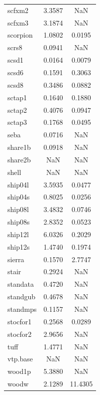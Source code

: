 \begin{longtable}{lcc}
scfxm2   &   3.3587 &      NaN \\
scfxm3   &   3.1874 &      NaN \\
scorpion &   1.0802 &   0.0195 \\
scrs8    &   0.0941 &      NaN \\
scsd1    &   0.0164 &   0.0079 \\
scsd6    &   0.1591 &   0.3063 \\
scsd8    &   0.3486 &   0.0882 \\
sctap1   &   0.1640 &   0.1880 \\
sctap2   &   0.4076 &   0.0947 \\
sctap3   &   0.1768 &   0.0495 \\
seba     &   0.0716 &      NaN \\
share1b  &   0.0918 &      NaN \\
share2b  &      NaN &      NaN \\
shell    &      NaN &      NaN \\
ship04l  &   3.5935 &   0.0477 \\
ship04s  &   0.8025 &   0.0256 \\
ship08l  &   3.4832 &   0.0746 \\
ship08s  &   2.8352 &   0.0523 \\
ship12l  &   6.0326 &   0.2029 \\
ship12s  &   1.4740 &   0.1974 \\
sierra   &   0.1570 &   2.7747 \\
stair    &   0.2924 &      NaN \\
standata &   0.4720 &      NaN \\
standgub &   0.4678 &      NaN \\
standmps &   0.1157 &      NaN \\
stocfor1 &   0.2568 &   0.0289 \\
stocfor2 &   2.9656 &      NaN \\
tuff     &   1.4771 &      NaN \\
vtp.base &      NaN &      NaN \\
wood1p   &   5.3880 &      NaN \\
woodw    &   2.1289 &  11.4305 \\
\end{longtable}

